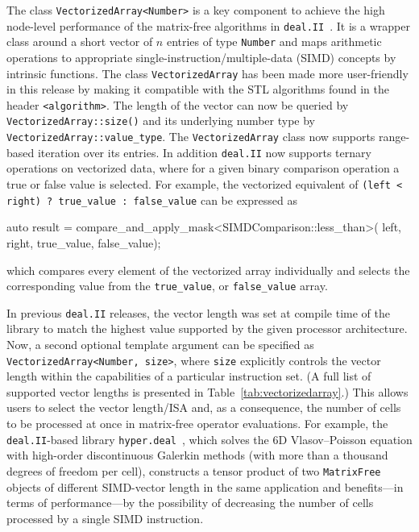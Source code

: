 \documentclass{ansarticle-preprint}
\newcommand{\specialword}[1]{\texttt{#1}}
\newcommand{\dealii}{{\specialword{deal.II}}\xspace}
\begin{document}
The class \texttt{VectorizedArray<Number>} is a key component to achieve
the high node-level performance of the matrix-free algorithms in
\dealii{}~\cite{KronbichlerKormann2012, KronbichlerKormann2019}. It is a
wrapper class around a short vector of $n$ entries of type \texttt{Number}
and maps arithmetic operations to appropriate
single-instruction/multiple-data (SIMD) concepts by intrinsic functions.
The class \texttt{VectorizedArray} has been made more user-friendly in this
release by making it compatible with the STL algorithms found in the header
\texttt{<algorithm>}. The length of the  vector can now be queried by
\texttt{VectorizedArray::size()} and its underlying number type by
\texttt{VectorizedArray::value\_type}. The \texttt{VectorizedArray} class
now supports range-based iteration over its entries. In addition \dealii{}
now supports ternary operations on vectorized data, where for a given
binary comparison operation a true or false value is selected. For example,
the vectorized equivalent of \texttt{(left < right) ? true\_value :
  false\_value} can be expressed as
\begin{c++}
auto result = compare_and_apply_mask<SIMDComparison::less_than>(
left, right, true_value, false_value);
\end{c++}
which compares every element of the vectorized array individually and
selects the corresponding value from the \texttt{true\_value}, or
\texttt{false\_value} array.

In previous \dealii{} releases, the vector length was set at compile time
of the library to match the highest value supported by the given processor
architecture. Now, a second optional template argument can be specified as
\texttt{VectorizedArray<Number, size>}, where \texttt{size} explicitly
controls the vector length within the capabilities of a particular
instruction set. (A full list of supported vector lengths is presented in
Table~\ref{tab:vectorizedarray}.) This allows users to select the vector
length/ISA and, as a consequence, the number of cells to be processed at
once in matrix-free operator evaluations. For example, the \dealii{}-based
library \texttt{hyper.deal}~\cite{munch2020hyperdeal}, which solves the 6D
Vlasov--Poisson equation with high-order discontinuous Galerkin methods
(with more than a thousand degrees of freedom per cell), constructs a
tensor product of two \texttt{MatrixFree} objects of different SIMD-vector
length in the same application and benefits---in terms of performance---by
the possibility of decreasing the number of cells processed by a single
SIMD instruction.
\end{document}
